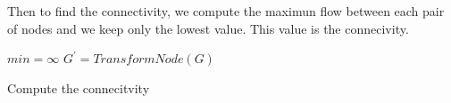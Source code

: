 Then to find the connectivity, we compute the maximun flow between each pair of nodes and we keep only the lowest value. This value is the connecivity.


\begin{algorithm}[!h]
    $min = \infty$\;
    $G^{'} = TransformNode(G)$\;
    \;
    \caption{Compute the connecitvity}
\end{algorithm}

%

